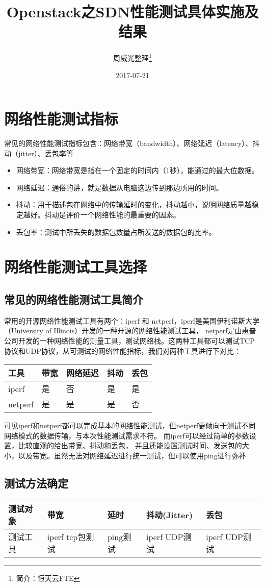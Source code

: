 \documentclass[a4paper,left=1.5cm,right=1.5cm,11pt]{article}
\title{Openstack之SDN性能测试具体实施及结果}
\author{周威光整理\footnote{简介：恒天云FTE}}
\date{2017-07-21}
\begin{document}
\maketitle
\clearpage
\tableofcontents
\clearpage
\section{网络性能测试指标}
常见的网络性能测试指标包含：网络带宽（bandwidth）、网络延迟（latency）、抖动（jitter）、丢包率等
\begin{itemize}
	\item[1.]网络带宽：网络带宽是指在一个固定的时间内（1秒），能通过的最大位数据。
	\item[2.]网络延迟：通俗的讲，就是数据从电脑这边传到那边所用的时间。
	\item[3.]抖动：用于描述包在网络中的传输延时的变化，抖动越小，说明网络质量越稳定越好。抖动是评价一个网络性能的最重要的因素。
	\item[4.]丢包率：测试中所丢失的数据包数量占所发送的数据包的比率。
\end{itemize}
\section{网络性能测试工具选择}
\subsection{常见的网络性能测试工具简介}
常用的开源网络性能测试工具有两个：iperf 和 netperf，iperf是美国伊利诺斯大学（University of Illinois）开发的一种开源的网络性能测试工具，
netperf是由惠普公司开发的一种网络性能的测量工具，测试网络栈。这两种工具都可以测试TCP协议和UDP协议，从可测试的网络性能指标，我们对两种工具进行下对比：
\begin{center}
\begin{tabular}[c]{|l|l|l|l|l|}
\hline
工具 & 带宽 & 网络延迟 & 抖动 & 丢包 \\
\hline
iperf & 是 & 否 & 是 & 是 \\
\hline
netperf & 是 & 是 & 是 & 否 \\
\hline
\end{tabular}
\end{center}\par
可见iperf和netperf都可以完成基本的网络性能测试，但netperf更倾向于测试不同网络模式的数据传输，与本次性能测试需求不符。
而iperf可以经过简单的参数设置，比较直观的给出带宽、抖动和丢包，
并且还能设置测试时间、发送包的大小，以及带宽。虽然无法对网络延迟进行统一测试，但可以使用ping进行弥补
\subsection{测试方法确定}
\begin{center}
\begin{tabular}[c]{|l|l|l|l|l|}
\hline
测试对象 & 带宽 & 延时 & 抖动(Jitter) & 丢包 \\
\hline
测试工具 & iperf tcp包测试 & ping测试 & iperf UDP测试 & iperf UDP测试 \\
\hline
\end{tabular}
\end{center}
\end{document}
